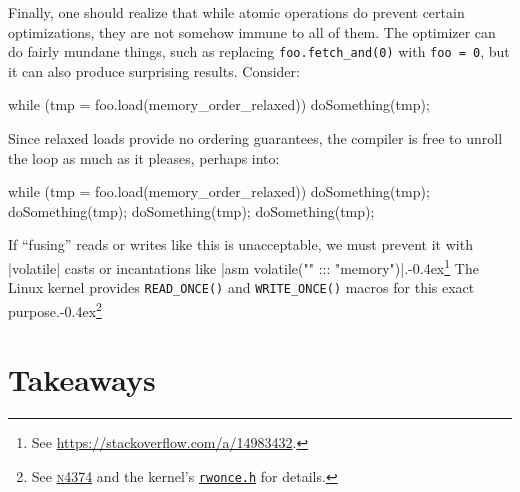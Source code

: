\documentclass[fontsize=10pt, oneside]{scrartcl}
\newcommand{\punckern}{\kern-0.4ex}
\newcommand{\monobox}[1]{\mbox{\texttt{#1}}}
\begin{document}
Finally, one should realize that while atomic operations do prevent certain optimizations,
they are not somehow immune to all of them.
The optimizer can do fairly mundane things, such as replacing
\monobox{foo.fetch\_and(0)} with \monobox{foo = 0},
but it can also produce surprising results.
Consider:
\begin{cppcode}
while (tmp = foo.load(memory_order_relaxed)) {
    doSomething(tmp);
}
\end{cppcode}
Since relaxed loads provide no ordering guarantees,
the compiler is free to unroll the loop as much as it pleases,
perhaps into:
\begin{cppcode}
while (tmp = foo.load(memory_order_relaxed)) {
    doSomething(tmp);
    doSomething(tmp);
    doSomething(tmp);
    doSomething(tmp);
}
\end{cppcode}
If ``fusing'' reads or writes like this is unacceptable,
we must prevent it
with \cpp|volatile| casts or incantations like \cpp|asm volatile("" ::: "memory")|.\punckern\footnote{See
\url{https://stackoverflow.com/a/14983432}.}
The Linux kernel provides \monobox{READ\_ONCE()} and \monobox{WRITE\_ONCE()}
macros for this exact purpose.\punckern\footnote{See
\href{https://www.open-std.org/jtc1/sc22/wg21/docs/papers/2015/n4374.html}{\textsc{n}4374}
and the kernel's
\href{https://elixir.bootlin.com/linux/latest/source/include/asm-generic/rwonce.h}{\texttt{rwonce.h}} for details.}

\section{Takeaways}
\end{document}
